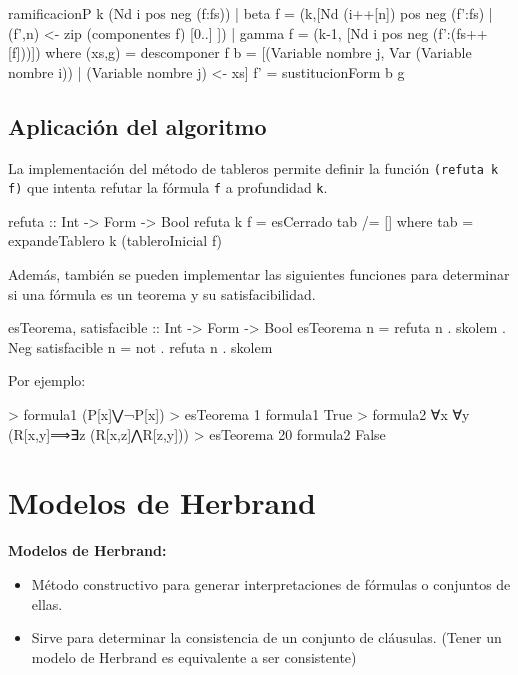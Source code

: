 \documentclass{beamer}
\begin{document}
\begin{frame}[fragile]
  \begin{code}
ramificacionP k (Nd i pos neg (f:fs))
    | beta     f = 
        (k,[Nd (i++[n]) pos neg (f':fs)
           | (f',n) <- zip (componentes f) [0..] ])
    | gamma    f = (k-1, [Nd i pos neg (f':(fs++[f]))])
    where 
      (xs,g) = descomponer f
      b      =
          [(Variable nombre j, Var (Variable nombre i))
          | (Variable nombre j) <- xs]
      f'     = sustitucionForm b g
  \end{code}
\end{frame}

\subsection{Aplicación del algoritmo}

\begin{frame}[fragile]
  La implementación del método de tableros permite definir la función \texttt{(refuta k f)}
  que intenta refutar la fórmula \texttt{f} a profundidad \texttt{k}.
  \begin{code}
refuta :: Int -> Form -> Bool
refuta k f = esCerrado tab /= []
    where tab = expandeTablero k (tableroInicial f)  
  \end{code}
  Además, también se pueden implementar las siguientes funciones para determinar si una fórmula
  es un teorema y su satisfacibilidad. 
  \begin{code}
esTeorema, satisfacible :: Int -> Form -> Bool
esTeorema n = refuta n . skolem . Neg
satisfacible n = not . refuta n . skolem
\end{code}
\end{frame}

\begin{frame}[fragile]
  Por ejemplo:

\begin{code}  
> formula1
(P[x]⋁¬P[x])
> esTeorema 1 formula1
True
> formula2
∀x ∀y (R[x,y]⟹∃z (R[x,z]⋀R[z,y]))
> esTeorema 20 formula2
False
\end{code}  
\end{frame}
\section{Modelos de Herbrand}

\begin{frame}
  \textbf{Modelos de Herbrand:}
  \begin{itemize}
  \item Método constructivo para generar interpretaciones de fórmulas o conjuntos de ellas.
  \item Sirve para determinar la consistencia de un conjunto de cláusulas. (Tener un modelo de
    Herbrand es equivalente a ser consistente)
  \end{itemize}
\end{frame}
\end{document}
